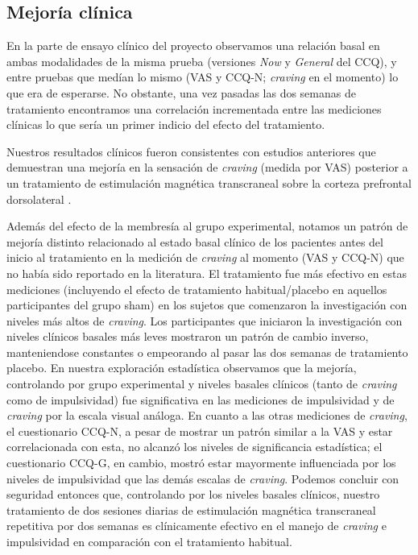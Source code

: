 \subsection{Mejoría clínica}
En la parte de ensayo clínico del proyecto observamos una relación basal en ambas modalidades de la misma prueba (versiones \textit{Now} y \textit{General} del CCQ), y entre pruebas que medían lo mismo (VAS y CCQ-N; \textit{craving} en el momento) lo que era de esperarse. No obstante, una vez pasadas las dos semanas de tratamiento encontramos una correlación incrementada entre las mediciones clínicas lo que sería un primer indicio del efecto del tratamiento. \par
Nuestros resultados clínicos fueron consistentes con estudios anteriores que demuestran una mejoría en la sensación de \textit{craving} (medida por VAS) posterior a un tratamiento de estimulación magnética transcraneal sobre la corteza prefrontal dorsolateral \parencite{Politi2008, Terraneo2016}. \par
Además del efecto de la membresía al grupo experimental, notamos un patrón de mejoría distinto relacionado al estado basal clínico de los pacientes antes del inicio al tratamiento en la medición de \textit{craving} al momento (VAS y CCQ-N) que no había sido reportado en la literatura.
El tratamiento fue más efectivo en estas mediciones (incluyendo el efecto de tratamiento habitual/placebo en aquellos participantes del grupo sham) en los sujetos que comenzaron la investigación con niveles más altos de \textit{craving}. Los participantes que iniciaron la investigación con niveles clínicos basales más leves mostraron un patrón de cambio inverso, manteniendose constantes o empeorando al pasar las dos semanas de tratamiento placebo.
En nuestra exploración estadística observamos que la mejoría, controlando por grupo experimental y niveles basales clínicos (tanto de \textit{craving} como de impulsividad) fue significativa en las mediciones de impulsividad y de \textit{craving} por la escala visual análoga. En cuanto a las otras mediciones de \textit{craving}, el cuestionario  CCQ-N, a pesar de mostrar un patrón similar a la VAS y estar correlacionada con esta, no alcanzó los niveles de significancia estadística; el cuestionario CCQ-G, en cambio, mostró estar mayormente influenciada por los niveles de impulsividad que las demás escalas de \textit{craving}.
Podemos concluir con seguridad entonces que, controlando por los niveles basales clínicos, nuestro tratamiento de dos sesiones diarias de estimulación magnética transcraneal repetitiva por dos semanas es clínicamente efectivo en el manejo de \textit{craving} e impulsividad en comparación con el tratamiento habitual.

